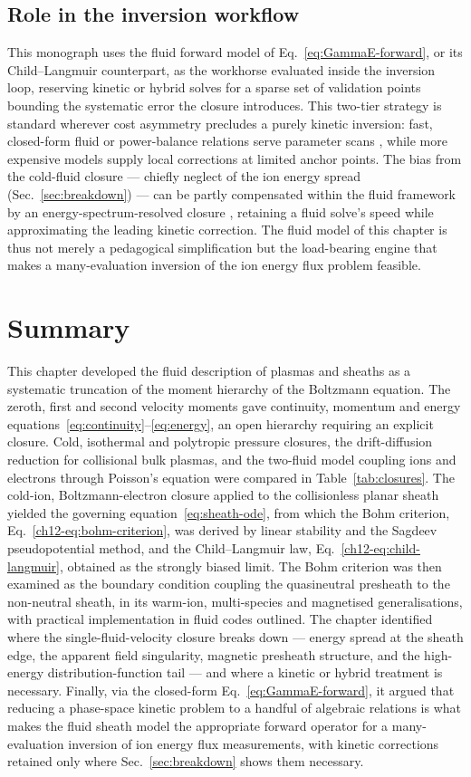 \subsection{Role in the inversion workflow}

This monograph uses the fluid forward model of Eq.~\eqref{eq:GammaE-forward}, or its Child--Langmuir counterpart, as the workhorse evaluated inside the inversion loop, reserving kinetic or hybrid solves for a sparse set of validation points bounding the systematic error the closure introduces. This two-tier strategy is standard wherever cost asymmetry precludes a purely kinetic inversion: fast, closed-form fluid or power-balance relations serve parameter scans \cite{ref0093}, while more expensive models supply local corrections at limited anchor points. The bias from the cold-fluid closure — chiefly neglect of the ion energy spread (Sec.~\ref{sec:breakdown}) — can be partly compensated within the fluid framework by an energy-spectrum-resolved closure \cite{ref0083}, retaining a fluid solve's speed while approximating the leading kinetic correction. The fluid model of this chapter is thus not merely a pedagogical simplification but the load-bearing engine that makes a many-evaluation inversion of the ion energy flux problem feasible.

\section{Summary}

This chapter developed the fluid description of plasmas and sheaths as a systematic truncation of the moment hierarchy of the Boltzmann equation. The zeroth, first and second velocity moments gave continuity, momentum and energy equations~\eqref{eq:continuity}--\eqref{eq:energy}, an open hierarchy requiring an explicit closure. Cold, isothermal and polytropic pressure closures, the drift-diffusion reduction for collisional bulk plasmas, and the two-fluid model coupling ions and electrons through Poisson's equation were compared in Table~\ref{tab:closures}. The cold-ion, Boltzmann-electron closure applied to the collisionless planar sheath yielded the governing equation~\eqref{eq:sheath-ode}, from which the Bohm criterion, Eq.~\eqref{ch12-eq:bohm-criterion}, was derived by linear stability and the Sagdeev pseudopotential method, and the Child--Langmuir law, Eq.~\eqref{ch12-eq:child-langmuir}, obtained as the strongly biased limit. The Bohm criterion was then examined as the boundary condition coupling the quasineutral presheath to the non-neutral sheath, in its warm-ion, multi-species and magnetised generalisations, with practical implementation in fluid codes outlined. The chapter identified where the single-fluid-velocity closure breaks down — energy spread at the sheath edge, the apparent field singularity, magnetic presheath structure, and the high-energy distribution-function tail — and where a kinetic or hybrid treatment is necessary. Finally, via the closed-form Eq.~\eqref{eq:GammaE-forward}, it argued that reducing a phase-space kinetic problem to a handful of algebraic relations is what makes the fluid sheath model the appropriate forward operator for a many-evaluation inversion of ion energy flux measurements, with kinetic corrections retained only where Sec.~\ref{sec:breakdown} shows them necessary.
